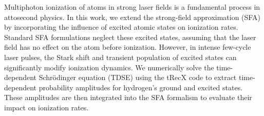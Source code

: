 Multiphoton ionization of atoms in strong laser fields is a fundamental process in attosecond physics. In this work, we extend the strong-field approximation (SFA) by incorporating the influence of excited atomic states on ionization rates. Standard SFA formulations neglect these excited states, assuming that the laser field has no effect on the atom before ionization. However, in intense few-cycle laser pulses, the Stark shift and transient population of excited states can significantly modify ionization dynamics. We numerically solve the time-dependent Schrödinger equation (TDSE) using the tRecX code to extract time-dependent probability amplitudes for hydrogen’s ground and excited states. These amplitudes are then integrated into the SFA formalism to evaluate their impact on ionization rates. 